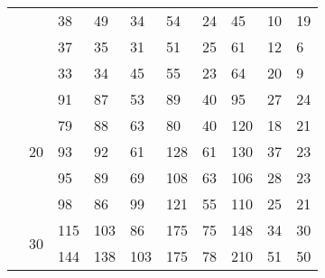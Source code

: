 \begin{table}[h]
\begin{tabular}{ll|l|l|l|l|l|l|l|l|}
\multicolumn{1}{|l|}{}                     &                                          & 38              & 49            & 34              & 54            & 24              & 45            & 10              & 19            \\ \cline{3-10} 
\multicolumn{1}{|l|}{}                     &                                          & 37              & 35            & 31              & 51            & 25              & 61            & 12              & 6             \\ \cline{3-10} 
\multicolumn{1}{|l|}{}                     &                                          & 33              & 34            & 45              & 55            & 23              & 64            & 20              & 9             \\ \cline{2-10} 
\multicolumn{1}{|l|}{}                     & \multirow{5}{*}{20}                      & 91              & 87            & 53              & 89            & 40              & 95            & 27              & 24            \\ \cline{3-10} 
\multicolumn{1}{|l|}{}                     &                                          & 79              & 88            & 63              & 80            & 40              & 120           & 18              & 21            \\ \cline{3-10} 
\multicolumn{1}{|l|}{}                     &                                          & 93              & 92            & 61              & 128           & 61              & 130           & 37              & 23            \\ \cline{3-10} 
\multicolumn{1}{|l|}{}                     &                                          & 95              & 89            & 69              & 108           & 63              & 106           & 28              & 23            \\ \cline{3-10} 
\multicolumn{1}{|l|}{}                     &                                          & 98              & 86            & 99              & 121           & 55              & 110           & 25              & 21            \\ \cline{2-10} 
\multicolumn{1}{|l|}{}                     & \multirow{5}{*}{30}                      & 115             & 103           & 86              & 175           & 75              & 148           & 34              & 30            \\ \cline{3-10} 
\multicolumn{1}{|l|}{}                     &                                          & 144             & 138           & 103             & 175           & 78              & 210           & 51              & 50            \\ \cline{3-10} 

\end{tabular}
\end{table}
